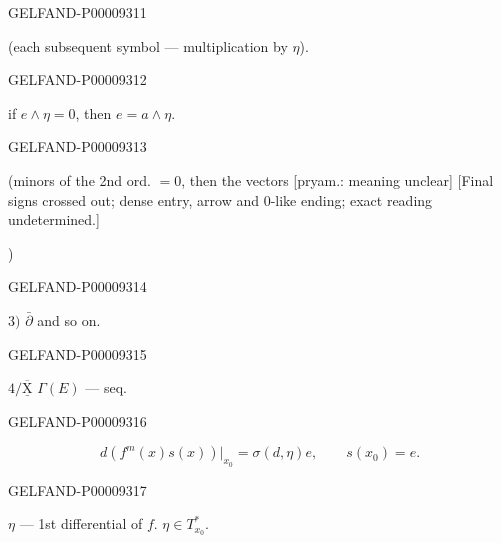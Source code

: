 \begin{GelfandAdjacentEvidence}{GELFAND-P000093}{11}

(each subsequent symbol — multiplication by $\eta$).
\end{GelfandAdjacentEvidence}
\begin{GelfandAdjacentEvidence}{GELFAND-P000093}{12}

 if $e\wedge\eta=0$, then $e=a\wedge\eta$.
\end{GelfandAdjacentEvidence}
\begin{GelfandAdjacentEvidence}{GELFAND-P000093}{13}

(minors of the 2nd ord. $=0$, then the vectors [pryam.: meaning unclear]
[Final signs crossed out; dense entry, arrow and $0$-like ending; exact reading undetermined.]

)
\end{GelfandAdjacentEvidence}
\begin{GelfandAdjacentEvidence}{GELFAND-P000093}{14}

$3)$ $\bar\partial$ and so on.
\end{GelfandAdjacentEvidence}
\begin{GelfandAdjacentEvidence}{GELFAND-P000093}{15}


$4/\overline{\underline{\mathrm{X}}}$  $\Gamma(E)$ — seq.
\end{GelfandAdjacentEvidence}
\begin{GelfandAdjacentEvidence}{GELFAND-P000093}{16}

\begin{equation*}
d(f^m(x)s(x))\big|_{x_0}=\sigma(d,\eta)e,\qquad s(x_0)=e.
\end{equation*}
\end{GelfandAdjacentEvidence}
\begin{GelfandAdjacentEvidence}{GELFAND-P000093}{17}

$\eta$ — 1st differential of $f$.
$\eta\in T_{x_0}^*$.
\end{GelfandAdjacentEvidence}
